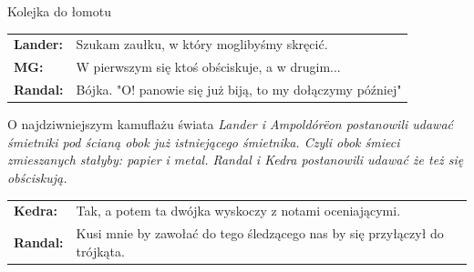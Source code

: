\documentclass[10pt,twoside,twocolumn]{book}
\begin{document}
\begin{rpg-quotebox}{Kolejka do łomotu}
   \begin{tabularx}{\columnwidth}{lX}
      \textbf{Lander:} & Szukam zaułku, w który moglibyśmy skręcić.\\
      \textbf{MG:} & W pierwszym się ktoś obściskuje, a w drugim...\\
      \textbf{Randal:} & Bójka. "O! panowie się już biją, to my dołączymy później"\\
   \end{tabularx}
\end{rpg-quotebox}


\begin{rpg-quotebox}{O najdziwniejszym kamuflażu świata}
   \textit{Lander i Ampoldórëon postanowili udawać śmietniki pod ścianą obok już istniejącego śmietnika. Czyli obok śmieci zmieszanych stałyby: papier i metal. Randal i Kedra postanowili udawać że też się obściskują.}\\

   \begin{tabularx}{\columnwidth}{lX}
      \textbf{Kedra:} & Tak, a potem ta dwójka wyskoczy z notami oceniającymi.\\
      \textbf{Randal:} & Kusi mnie by zawołać do tego śledzącego nas by się przyłączył do trójkąta.\\
   \end{tabularx}
\end{rpg-quotebox}
\end{document}
